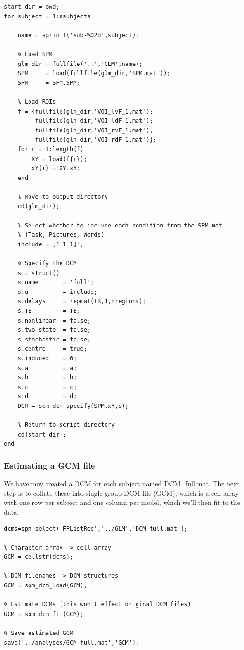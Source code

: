 \documentclass{article}
\begin{document}
\begin{lstlisting}[style=Matlab-editor,caption=DCM specification]
start_dir = pwd;
for subject = 1:nsubjects
    
    name = sprintf('sub-%02d',subject);
    
    % Load SPM
    glm_dir = fullfile('..','GLM',name);
    SPM     = load(fullfile(glm_dir,'SPM.mat'));
    SPM     = SPM.SPM;
    
    % Load ROIs
    f = {fullfile(glm_dir,'VOI_lvF_1.mat');
         fullfile(glm_dir,'VOI_ldF_1.mat');
         fullfile(glm_dir,'VOI_rvF_1.mat');
         fullfile(glm_dir,'VOI_rdF_1.mat')};    
    for r = 1:length(f)
        XY = load(f{r});
        xY(r) = XY.xY;
    end
    
    % Move to output directory
    cd(glm_dir);
    
    % Select whether to include each condition from the SPM.mat
    % (Task, Pictures, Words)
    include = [1 1 1]';

    % Specify the DCM
    s = struct();
    s.name       = 'full';
    s.u          = include;                 
    s.delays     = repmat(TR,1,nregions);
    s.TE         = TE;
    s.nonlinear  = false;
    s.two_state  = false;
    s.stochastic = false;
    s.centre     = true;
    s.induced    = 0;
    s.a          = a;
    s.b          = b;
    s.c          = c;
    s.d          = d;
    DCM = spm_dcm_specify(SPM,xY,s);
    
    % Return to script directory
    cd(start_dir);
end
\end{lstlisting}

\subsubsection{Estimating a GCM file}

We have now created a DCM for each subject named DCM\_full.mat. The next step is to collate these into single group DCM file (GCM), which is a cell array with one row per subject and one column per model, which we'll then fit to the data:

\begin{lstlisting}[style=Matlab-editor, caption=Estimating models]
% Find all DCM files
dcms=spm_select('FPListRec','../GLM','DCM_full.mat');

% Character array -> cell array
GCM = cellstr(dcms);
    
% DCM filenames -> DCM structures
GCM = spm_dcm_load(GCM);

% Estimate DCMs (this won't effect original DCM files)
GCM = spm_dcm_fit(GCM);

% Save estimated GCM
save('../analyses/GCM_full.mat','GCM');
    
\end{lstlisting}
\end{document}
